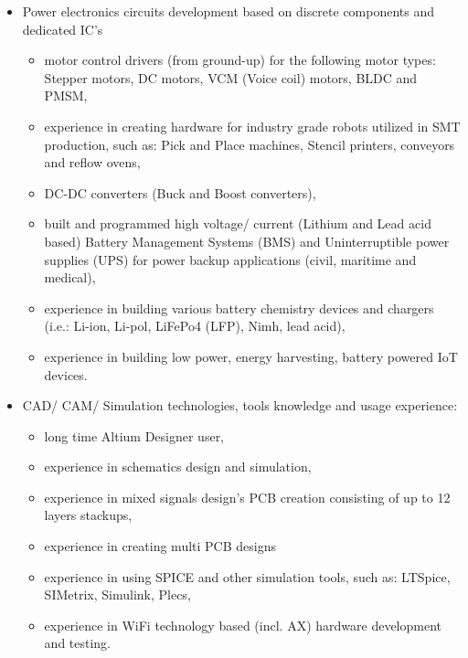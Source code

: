 \documentclass{tccv}
\begin{document}
\begin{itemize}
     \item Power electronics circuits development based on discrete components and dedicated IC's
     \begin{itemize}
          \item motor control drivers (from ground-up) for the following motor types: Stepper motors, DC motors, VCM (Voice coil) motors, BLDC and PMSM,
          \item experience in creating hardware for industry grade robots utilized in SMT production, such as: Pick and Place machines, Stencil printers, conveyors and reflow ovens,
     \item DC-DC converters (Buck and Boost converters),
     \item built and programmed high voltage/ current (Lithium and Lead acid based) Battery Management Systems (BMS) and Uninterruptible power supplies (UPS) for power backup applications (civil, maritime and medical),
     \item experience in building various battery chemistry devices and chargers (i.e.: Li-ion, Li-pol, LiFePo4 (LFP), Nimh, lead acid), 
     \item experience in building low power, energy harvesting, battery powered IoT devices.
     \end{itemize}
\end{itemize}

\begin{itemize}
     \item CAD/ CAM/ Simulation technologies, tools knowledge and usage experience:
     \begin{itemize}
          \item long time Altium Designer user,
          \item experience in schematics design and simulation,
          \item experience in mixed signals design's PCB creation consisting of up to 12 layers stackups,
          \item experience in creating multi PCB designs
          \item experience in using SPICE and other simulation tools, such as: LTSpice, SIMetrix, Simulink, Plecs,
          \item experience in WiFi technology based (incl. AX) hardware development and testing.
          
     \end{itemize}
\end{itemize}
     
\end{document}
